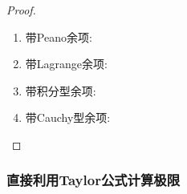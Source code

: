 \documentclass[../../main.tex]{subfiles}%
\begin{document}
\begin{proof}
\begin{enumerate}[(1)]
\item {\heiti 带Peano余项:}



\item  {\heiti 带Lagrange余项:}



\item {\heiti 带积分型余项:}



\item {\heiti 带Cauchy型余项:}


\end{enumerate}

\end{proof}


\subsubsection{直接利用Taylor公式计算极限}
\end{document}
